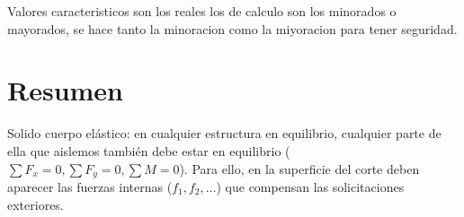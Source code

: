 Valores caracteristicos son los reales los de calculo son los minorados o mayorados, se hace tanto la minoracion como la miyoracion para tener seguridad.



\section{Resumen}



Solido cuerpo elástico: en cualquier estructura en equilibrio, cualquier parte de ella que aislemos también debe estar en equilibrio ($\sum F_x = 0, \sum F_y = 0, \sum M = 0$). Para ello, en la superficie del corte deben aparecer las fuerzas internas ($f_1, f_2, \dots$) que compensan las solicitaciones exteriores.



